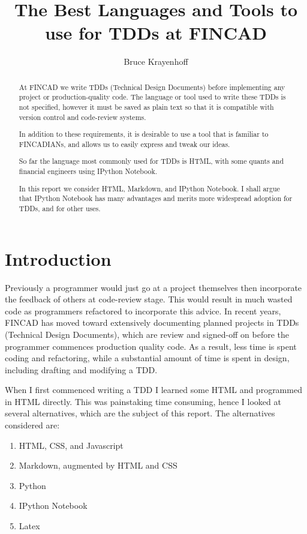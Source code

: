 \documentclass[]{article}
\title{The Best Languages and Tools to use for TDDs at FINCAD}
\author{Bruce Krayenhoff}
\begin{document}
\maketitle

\begin{abstract}
At FINCAD we write TDDs (Technical Design Documents) before implementing any project or production-quality code.  The language or tool used to write these TDDs is not specified, however it must be saved as plain text so that it is compatible with version control and code-review systems.

In addition to these requirements, it is desirable to use a tool that is familiar to FINCADIANs, and allows us to easily express and tweak our ideas.

So far the language most commonly used for TDDs is HTML, with some quants and financial engineers using IPython Notebook.

In this report we consider HTML, Markdown, and IPython Notebook.  I shall argue that IPython Notebook has many advantages and merits more widespread adoption for TDDs, and for other uses.
\end{abstract}

\section{Introduction}
Previously a programmer would just go at a project themselves then incorporate the feedback of others at code-review stage.  This would result in much wasted code as programmers refactored to incorporate this advice. In recent years, FINCAD has moved toward extensively documenting planned projects in TDDs (Technical Design Documents), which are review and signed-off on before the programmer commences production quality code.  As a result, less time is spent coding and refactoring, while a substantial amount of time is spent in design, including drafting and modifying a TDD.

When I first commenced writing a TDD I learned some HTML and programmed in HTML directly. This was painstaking time consuming, hence I looked at several alternatives, which are the subject of this report.  The alternatives considered are:

\begin{enumerate}
	\item HTML, CSS, and Javascript
	\item Markdown, augmented by HTML and CSS
	\item Python
	\item IPython Notebook
	\item Latex
\end{enumerate}
\end{document}
